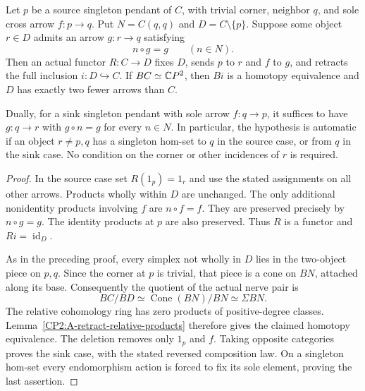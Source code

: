 \begin{proposition}
\label{CP2:A-singleton-pendant-fold}
Let $p$ be a source singleton pendant of $C$, with trivial corner,
neighbor $q$, and sole cross arrow $f:p\to q$. Put $N=C(q,q)$
and $D=C\setminus\{p\}$. Suppose some object $r\in D$ admits
an arrow $g:r\to q$ satisfying
\[
 n\circ g=g\qquad(n\in N).
\]
Then an actual functor $R:C\to D$ fixes $D$, sends $p$ to $r$
and $f$ to $g$, and retracts the full inclusion $i:D\hookrightarrow C$.
If $BC\simeq\mathbb{C}P^2$, then $Bi$ is a homotopy equivalence and
$D$ has exactly two fewer arrows than $C$.

Dually, for a sink singleton pendant with sole arrow $f:q\to p$,
it suffices to have $g:q\to r$ with $g\circ n=g$ for every
$n\in N$. In particular, the hypothesis is automatic if an object
$r\ne p,q$ has a singleton hom-set to $q$ in the source case,
or from $q$ in the sink case. No condition on the corner or other
incidences of $r$ is required.
\end{proposition}
\begin{proof}
In the source case set $R(1_p)=1_r$ and use the stated assignments
on all other arrows. Products wholly within $D$ are unchanged.
The only additional nonidentity products involving $f$ are
$n\circ f=f$. They are preserved precisely by $n\circ g=g$.
The identity products at $p$ are also preserved. Thus $R$ is a
functor and $Ri=\operatorname{id}_D$.

As in the preceding proof, every simplex not wholly in $D$ lies
in the two-object piece on $p,q$. Since the corner at $p$ is
trivial, that piece is a cone on $BN$, attached along its base.
Consequently the quotient of the actual nerve pair is
\[
 BC/BD\simeq \operatorname{Cone}(BN)/BN\simeq\Sigma BN.
\]
The relative cohomology ring has zero products of positive-degree
classes. Lemma~\ref{CP2:A-retract-relative-products} therefore
gives the claimed homotopy equivalence. The deletion removes
only $1_p$ and $f$. Taking opposite categories proves the sink
case, with the stated reversed composition law. On a singleton
hom-set every endomorphism action is forced to fix its sole
element, proving the last assertion.
\end{proof}

